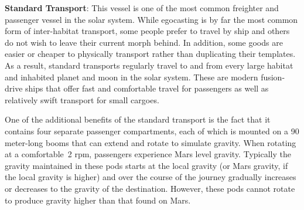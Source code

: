\textbf{Standard Transport}: This vessel is one of the most 
common freighter and passenger vessel in the solar 
system. While egocasting is by far the most common 
form of inter-habitat transport, some people prefer to 
travel by ship and others do not wish to leave their 
current morph behind. In addition, some goods are 
easier or cheaper to physically transport rather than 
duplicating their templates. As a result, standard 
transports regularly travel to and from every large 
habitat and inhabited planet and moon in the solar 
system. These are modern fusion-drive ships that offer 
fast and comfortable travel for passengers as well as 
relatively swift transport for small cargoes.

One of the additional benefits of the standard 
transport is the fact that it contains four separate passenger
compartments, each of which is mounted on
a 90 meter-long booms that can extend and rotate 
to simulate gravity. When rotating at a comfortable 2 
rpm, passengers experience Mars level gravity. Typically
the gravity maintained in these pods starts at
the local gravity (or Mars gravity, if the local gravity 
is higher) and over the course of the journey gradually 
increases or decreases to the gravity of the destination. 
However, these pods cannot rotate to produce gravity 
higher than that found on Mars.
